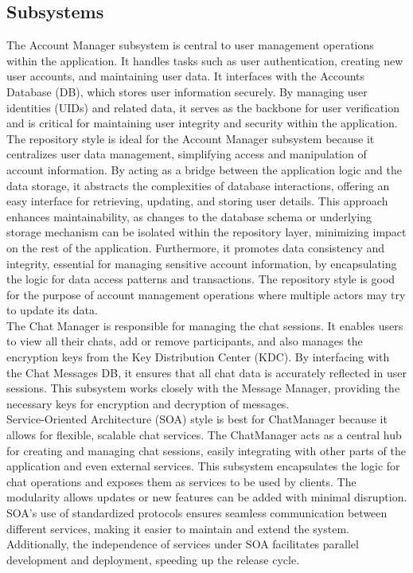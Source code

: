 \documentclass[]{article}
\begin{document}
\subsection{Subsystems}
\label{sub:subsystems}

The Account Manager subsystem is central to user management operations within the application. It handles tasks such as user authentication, creating new user accounts, and maintaining user data. It interfaces with the Accounts Database (DB), which stores user information securely. By managing user identities (UIDs) and related data, it serves as the backbone for user verification and is critical for maintaining user integrity and security within the application. \\

The repository style is ideal for the Account Manager subsystem because it centralizes user data management, simplifying access and manipulation of account information. By acting as a bridge between the application logic and the data storage, it abstracts the complexities of database interactions, offering an easy interface for retrieving, updating, and storing user details. This approach enhances maintainability, as changes to the database schema or underlying storage mechanism can be isolated within the repository layer, minimizing impact on the rest of the application. Furthermore, it promotes data consistency and integrity, essential for managing sensitive account information, by encapsulating the logic for data access patterns and transactions. The repository style is good for the purpose of account management operations where multiple actors may try to update its data. \\

The Chat Manager is responsible for managing the chat sessions. It enables users to view all their chats, add or remove participants, and also manages the encryption keys from the Key Distribution Center (KDC). By interfacing with the Chat Messages DB, it ensures that all chat data is accurately reflected in user sessions. This subsystem works closely with the Message Manager, providing the necessary keys for encryption and decryption of messages. \\

Service-Oriented Architecture (SOA) style is best for ChatManager because it allows for flexible, scalable chat services. The ChatManager acts as a central hub for creating and managing chat sessions, easily integrating with other parts of the application and even external services. This subsystem encapsulates the logic for chat operations and exposes them as services to be used by clients. The modularity allows updates or new features can be added with minimal disruption. SOA's use of standardized protocols ensures seamless communication between different services, making it easier to maintain and extend the system. Additionally, the independence of services under SOA facilitates parallel development and deployment, speeding up the release cycle. \\
\end{document}
